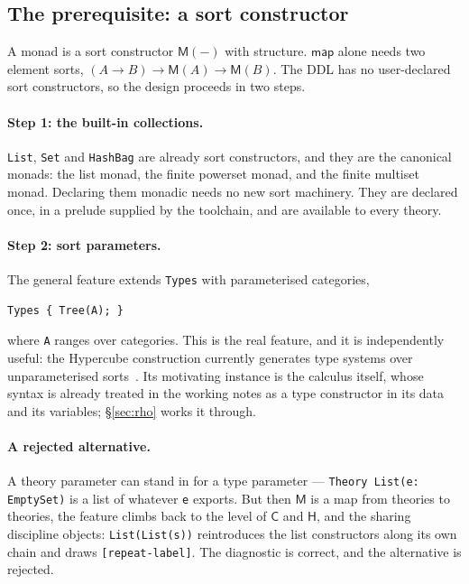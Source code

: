 \documentclass[11pt]{article}
\theoremstyle{branddef}
\theoremstyle{brandplain}
\theoremstyle{brandrem}
\newcommand{\M}{\mathsf{M}}
\newcommand{\fmap}{\mathsf{map}}
\newcommand{\cost}{\mathsf{C}}
\newcommand{\hist}{\mathsf{H}}
\begin{document}
\subsection{The prerequisite: a sort constructor}

A monad is a sort constructor \(\M(-)\) with structure. \(\fmap\) alone needs
two element sorts, \((A \to B) \to \M(A) \to \M(B)\). The DDL has no
user-declared sort constructors, so the design proceeds in two steps.

\paragraph{Step 1: the built-in collections.} \texttt{List}, \texttt{Set} and
\texttt{HashBag} are already sort constructors, and they are the canonical
monads: the list monad, the finite powerset monad, and the finite multiset
monad. Declaring them monadic needs no new sort machinery. They are declared once,
in a prelude supplied by the toolchain, and are available to every theory.

\paragraph{Step 2: sort parameters.} The general feature extends
\texttt{Types} with parameterised categories,
\begin{lstlisting}[language=mettail]
Types { Tree(A); }
\end{lstlisting}
where \texttt{A} ranges over categories. This is the real feature, and it is
independently useful: the Hypercube construction currently generates type
systems over unparameterised sorts~\cite{Hypercube}. Its motivating instance is
the calculus itself, whose syntax is already treated in the working notes as a
type constructor in its data and its variables; \S\ref{sec:rho} works it
through.

\paragraph{A rejected alternative.} A theory parameter can stand in for a type
parameter --- \texttt{Theory List(e: EmptySet)} is a list of whatever
\texttt{e} exports. But then \(\M\) is a map from theories to theories, the
feature climbs back to the level of \(\cost\) and \(\hist\), and the sharing
discipline objects: \texttt{List(List(s))} reintroduces the list constructors
along its own chain and draws \texttt{[repeat-label]}. The diagnostic is
correct, and the alternative is rejected.
\end{document}
